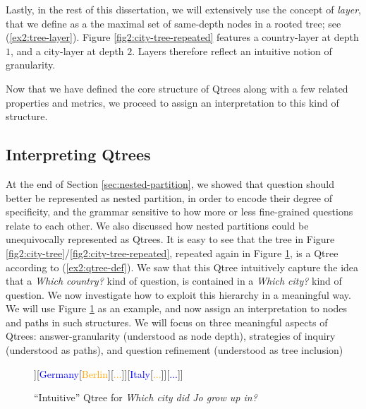 Lastly, in the rest of this dissertation, we will extensively use the concept of \textit{layer}, that we define as a the maximal set of same-depth nodes in a rooted tree; see (\ref{ex2:tree-layer}). Figure \ref{fig2:city-tree-repeated} features a country-layer at depth $1$, and a city-layer at depth $2$. Layers therefore reflect an intuitive notion of granularity.

\begin{exe}
	\label{ex2:tree-layer}
\end{exe}


Now that we have defined the core structure of Qtrees along with a few related properties and metrics, we proceed to assign an interpretation to this kind of structure.

\subsection{Interpreting Qtrees}\label{sec:interpreting-qtrees}
At the end of Section \ref{sec:nested-partition}, we showed that question should better be represented as nested partition, in order to encode their degree of specificity, and the grammar sensitive to how more or less fine-grained questions relate to each other. We also discussed how nested partitions could be unequivocally represented as Qtrees. It is easy to see that the tree in Figure \ref{fig2:city-tree}/\ref{fig2:city-tree-repeated}, repeated again in Figure \ref{fig2:city-qtree}, is a Qtree according to (\ref{ex2:qtree-def}). We saw that this Qtree intuitively capture the idea that a \textit{Which country?} kind of question, is contained in a \textit{Which city?} kind of question. We now investigate how to exploit this hierarchy in a meaningful way. We will use Figure \ref{fig2:city-qtree} as an example, and now assign an interpretation to nodes and paths in such structures. We will focus on three meaningful aspects of Qtrees: answer-granularity (understood as node depth), strategies of inquiry (understood as paths), and question refinement (understood as tree inclusion)

\begin{figure}[H]
	\centering
	\begin{forest}
		[{CS\\
			Jo grew up in...}[\textcolor{blue}{France}[\textcolor{orange}{{Paris}}][\textcolor{orange}{Lyon}][\textcolor{orange}{...}]][\textcolor{blue}{Germany}[\textcolor{orange}{Berlin}][\textcolor{orange}{...}]][\textcolor{blue}{Italy}[\textcolor{orange}{...}]][\textcolor{blue}{...}]]
	\end{forest}
	\caption{``Intuitive'' Qtree for \textit{Which city did Jo grow up in?}}\label{fig2:city-qtree}
\end{figure}

